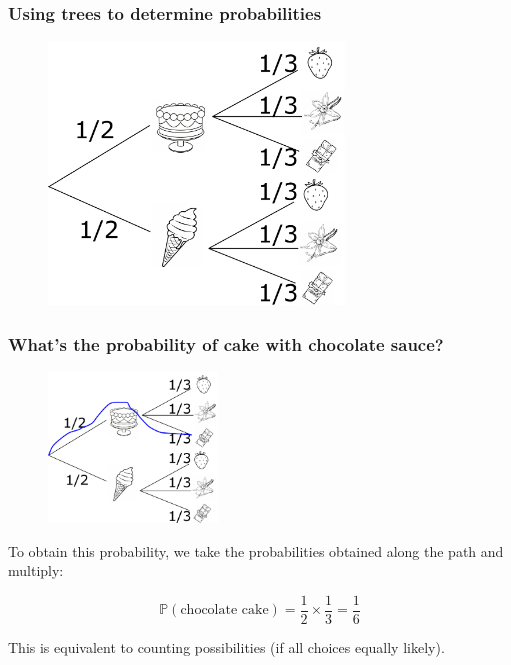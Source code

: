 \documentclass{beamer}
\begin{document}
	\begin{frame}
		\frametitle{Using trees to determine probabilities}
		
		\begin{figure}[ht]
			\centerline{\includegraphics[width=0.7\textwidth]{./figures/tree-prob.pdf}}
		\end{figure}
		
	\end{frame}

	\begin{frame}
		\frametitle{What's the probability of cake with chocolate sauce?}
		
		\begin{figure}[ht]
			\centerline{\includegraphics[width=0.4\textwidth]{./figures/tree-prob-choc-cake.pdf}}
		\end{figure}
	
	To obtain this probability, we take the probabilities obtained along the path and multiply:
	
	\begin{equation}
		\mathbb{P}(\text{chocolate cake}) = \frac{1}{2} \times \frac{1}{3} = \frac{1}{6}
	\end{equation}


	This is equivalent to counting possibilities (if all choices equally likely).
	
	\end{frame}
\end{document}
